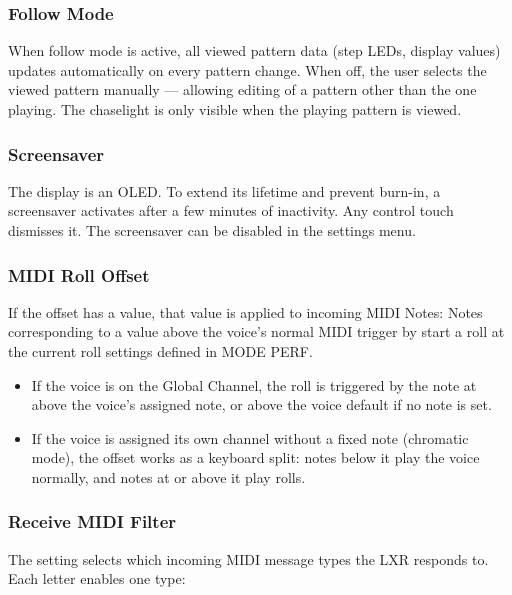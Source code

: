 \subsubsection{Follow Mode}\label{follow-mode}

When follow mode is active, all viewed pattern data (step LEDs, display
values) updates automatically on every pattern change. When off, the
user selects the viewed pattern manually --- allowing editing of a
pattern other than the one playing. The chaselight is only visible when
the playing pattern is viewed.

\subsubsection{Screensaver}\label{screensaver}

The display is an OLED. To extend its lifetime and prevent burn-in, a
screensaver activates after a few minutes of inactivity. Any control
touch dismisses it. The screensaver can be disabled in the settings
menu.

\subsubsection{MIDI Roll Offset}\label{midi-roll-offset}

If the  offset has a value, that value is applied to incoming
MIDI Notes: Notes corresponding to a value above the voice's normal MIDI
trigger by  start a roll at the current roll settings defined
in MODE PERF.

\begin{itemize}
\tightlist
\item
  If the voice is on the Global Channel, the roll is triggered by the
  note at  above the voice's assigned note, or above the
  voice default if no note is set.
\item
  If the voice is assigned its own channel without a fixed note
  (chromatic mode), the offset works as a keyboard split: notes below it
  play the voice normally, and notes at or above it play rolls.
\end{itemize}

\subsubsection{Receive MIDI Filter}\label{receive-midi-filter}

The  setting selects which incoming MIDI message types the
LXR responds to. Each letter enables one type:

